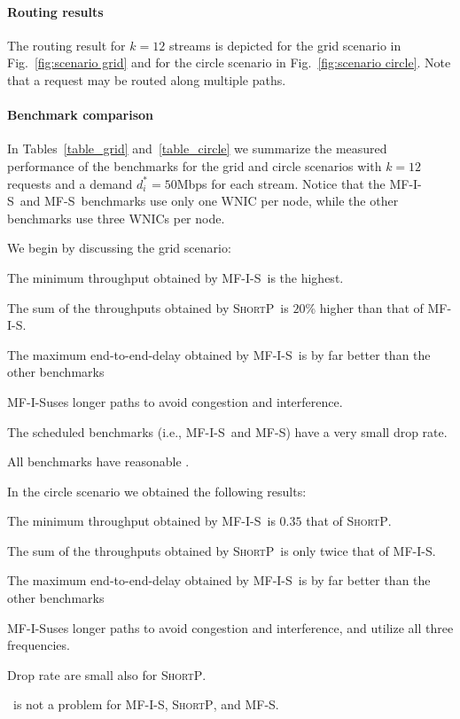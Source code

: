 \documentclass[12pt]{article}
\newenvironment{proof sketch}[1]{\noindent {\emph{Proof sketch of #1:}}}{\hfill \qed}
\newcommand{\PER}{\text{\sc{per}}}
\newcommand{\algA}{\textsc{MF-I-S}}
\newcommand{\algB}{\textsc{ShortP}}
\newcommand{\algE}{\textsc{MF-S}}
\begin{document}
\paragraph{Routing results}
The routing result for $k=12$ streams is depicted for the grid
scenario in Fig.~\ref{fig:scenario grid} and for the circle scenario
in Fig.~\ref{fig:scenario circle}.  Note that a request may be routed
along multiple paths.

\paragraph{Benchmark comparison}
In Tables~\ref{table_grid} and~\ref{table_circle} we summarize the
measured performance of the benchmarks for the grid and circle
scenarios with $k=12$ requests and a demand $d^*_i=50$Mbps for each
stream. Notice that the \algA\ and \algE\ benchmarks use only one WNIC
per node, while the other benchmarks use three WNICs per node.

We begin by discussing the grid scenario:
\begin{inparaenum}[(1)]
\item The minimum throughput obtained by \algA\ is the highest.
\item The sum of the throughputs obtained by \algB\ is $20$\% higher
  than that of \algA.
\item The maximum end-to-end-delay obtained by \algA\ is by far better than the other benchmarks
\item \algA uses longer paths to avoid congestion and interference.
\item The scheduled benchmarks (i.e., \algA\ and \algE ) have a very small drop rate.
\item  All benchmarks have reasonable \PER.
\end{inparaenum}

In the circle scenario we obtained the following results:
\begin{inparaenum}[(1)]
\item The minimum throughput obtained by \algA\ is $0.35$ that of \algB.
\item The sum of the throughputs obtained by \algB\ is only twice that of
  \algA.
\item The maximum end-to-end-delay obtained by \algA\ is by far better than the other benchmarks
\item \algA uses longer paths to avoid congestion and interference, and utilize all three frequencies.
\item Drop rate are small also for \algB.
\item  \PER\ is not a problem for \algA, \algB, and \algE.
\end{inparaenum}
\end{document}
